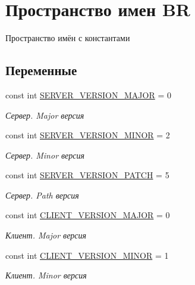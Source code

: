 \hypertarget{namespace_b_r}{}\section{Пространство имен BR}
\label{namespace_b_r}


Пространство имён с константами  


\subsection*{Переменные}
\begin{DoxyCompactItemize}
\item 
const int \mbox{\hyperlink{namespace_b_r_a767d5d7fec5adfa1bf5a7c03f98beaaf}{S\+E\+R\+V\+E\+R\+\_\+\+V\+E\+R\+S\+I\+O\+N\+\_\+\+M\+A\+J\+OR}} = 0
\begin{DoxyCompactList}\small\item\em Сервер. Major версия \end{DoxyCompactList}\item 
const int \mbox{\hyperlink{namespace_b_r_afb69faba1bc3b5d31b8514c0103b72a0}{S\+E\+R\+V\+E\+R\+\_\+\+V\+E\+R\+S\+I\+O\+N\+\_\+\+M\+I\+N\+OR}} = 2
\begin{DoxyCompactList}\small\item\em Сервер. Minor версия \end{DoxyCompactList}\item 
const int \mbox{\hyperlink{namespace_b_r_ad496b6d1eb6371bb740df7c7fac12aba}{S\+E\+R\+V\+E\+R\+\_\+\+V\+E\+R\+S\+I\+O\+N\+\_\+\+P\+A\+T\+CH}} = 5
\begin{DoxyCompactList}\small\item\em Сервер. Path версия \end{DoxyCompactList}\item 
const int \mbox{\hyperlink{namespace_b_r_a99a147d6069c07f03a2baf3bb531e308}{C\+L\+I\+E\+N\+T\+\_\+\+V\+E\+R\+S\+I\+O\+N\+\_\+\+M\+A\+J\+OR}} = 0
\begin{DoxyCompactList}\small\item\em Клиент. Major версия \end{DoxyCompactList}\item 
const int \mbox{\hyperlink{namespace_b_r_a4182b988c7afdd13d1e00d1a558c44ab}{C\+L\+I\+E\+N\+T\+\_\+\+V\+E\+R\+S\+I\+O\+N\+\_\+\+M\+I\+N\+OR}} = 1
\begin{DoxyCompactList}\small\item\em Клиент. Minor версия \end{DoxyCompactList}\item 

\end{DoxyCompactItemize}

